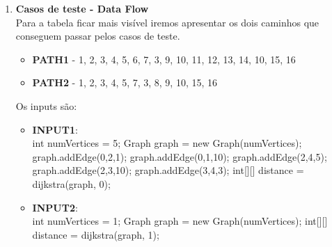 \documentclass{article}
\begin{document}
\begin{itemize}
\begin{enumerate}
    \item \textbf{Casos de teste - Data Flow}\\
    Para a tabela ficar mais visível iremos apresentar os dois caminhos que conseguem passar pelos casos de teste.\\
    \begin{itemize}
        \item \textbf{PATH1} - 1, 2, 3, 4, 5, 6, 7, 3, 9, 10, 11, 12, 13, 14, 10, 15, 16
        \item \textbf{PATH2} - 1, 2, 3, 4, 5, 7, 3, 8, 9, 10, 15, 16
    \end{itemize}
    Os inputs são:\\
    \begin{itemize}
        \item \textbf{INPUT1}:\\\newline int numVertices = 5;\newline
        Graph graph = new Graph(numVertices);\newline
        graph.addEdge(0,2,1);\newline
                graph.addEdge(0,1,10);\newline
                graph.addEdge(2,4,5);\newline
                graph.addEdge(2,3,10);\newline
                graph.addEdge(3,4,3);\newline
                int[][] distance = dijkstra(graph, 0);

        \item \textbf{INPUT2}:\\\newline int numVertices = 1;\newline
        Graph graph = new Graph(numVertices);\newline
        int[][] distance = dijkstra(graph, 1);
    \end{itemize}


\end{enumerate}
\end{itemize}
\end{document}
